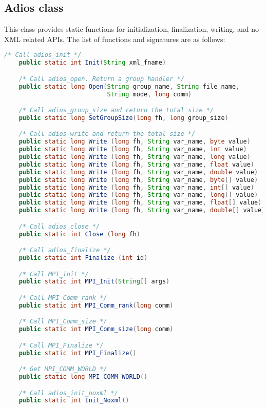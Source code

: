 \subsection{Adios class}
This class provides static functions for initialization, finalization, writing, and no-XML related APIs. The list of functions and signatures are as follows:
\begin{lstlisting}[language=Java,frame=single, backgroundcolor=\color{gray85},caption={Member functions in the Adios class},label={}]
    /* Call adios_init */
    public static int Init(String xml_fname)

    /* Call adios_open. Return a group handler */
    public static long Open(String group_name, String file_name, 
                            String mode, long comm)

    /* Call adios_group_size and return the total size */
    public static long SetGroupSize(long fh, long group_size)

    /* Call adios_write and return the total size */
    public static long Write (long fh, String var_name, byte value)
    public static long Write (long fh, String var_name, int value)
    public static long Write (long fh, String var_name, long value)
    public static long Write (long fh, String var_name, float value)
    public static long Write (long fh, String var_name, double value)
    public static long Write (long fh, String var_name, byte[] value)
    public static long Write (long fh, String var_name, int[] value)
    public static long Write (long fh, String var_name, long[] value)
    public static long Write (long fh, String var_name, float[] value)
    public static long Write (long fh, String var_name, double[] value)

    /* Call adios_close */
    public static int Close (long fh)

    /* Call adios_finalize */
    public static int Finalize (int id)

    /* Call MPI_Init */
    public static int MPI_Init(String[] args)

    /* Call MPI_Comm_rank */
    public static int MPI_Comm_rank(long comm)

    /* Call MPI_Comm_size */
    public static int MPI_Comm_size(long comm)

    /* Call MPI_Finalize */
    public static int MPI_Finalize()

    /* Get MPI_COMM_WORLD */
    public static long MPI_COMM_WORLD()

    /* Call adios_init_noxml */
    public static int Init_Noxml()


\end{lstlisting}
